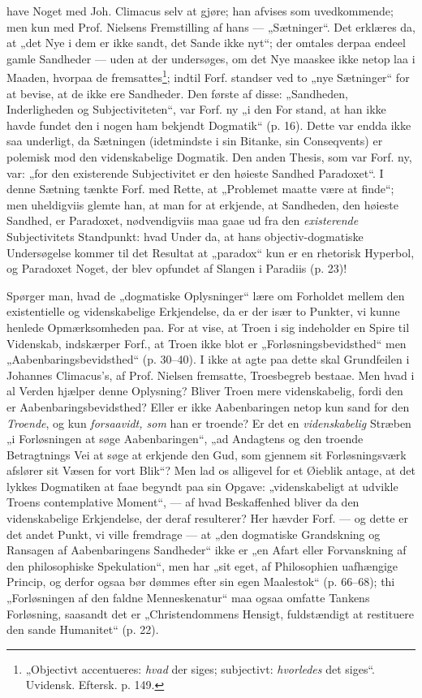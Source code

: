 \documentclass[12pt,a4paper]{book}
\newcommand{\opage}[1]{\marginnote{\footnotesize\textit{[#1]}}}
\begin{document}
have Noget med Joh. Climacus selv at gjøre; han afvises som
uvedkommende; men kun med Prof. Nielsens Fremstilling af
hans --- „Sætninger“. Det erklæres da, at „det Nye i dem
er ikke sandt, det Sande ikke nyt“; der omtales derpaa endeel
gamle Sandheder --- uden at der undersøges, om det Nye
maaskee ikke netop laa i Maaden, hvorpaa de fremsattes\footnote{„Objectivt accentueres: \emph{hvad} der siges; subjectivt: \emph{hvorledes} det
siges“. Uvidensk. Eftersk. p. 149.};
indtil Forf. standser ved to „nye Sætninger“ for at bevise,
at de ikke ere Sandheder. Den første af disse: „Sandheden,
Inderligheden og Subjectiviteten“, var Forf. ny „i den For%
\opage{33}\setcounter{footnote}{0}%
stand, at han ikke havde fundet den i nogen ham bekjendt
Dogmatik“ (p. 16). Dette var endda ikke saa underligt, da
Sætningen (idetmindste i sin Bitanke, sin Conseqvents) er
polemisk mod den videnskabelige Dogmatik. Den anden Thesis,
som var Forf. ny, var: „for den existerende Subjectivitet er
den høieste Sandhed Paradoxet“. I denne Sætning tænkte
Forf. med Rette, at „Problemet maatte være at finde“; men
uheldigviis glemte han, at man for at erkjende, at Sandheden,
den høieste Sandhed, er Paradoxet, nødvendigviis maa gaae
ud fra den \emph{existerende} Subjectivitets Standpunkt: hvad
Under da, at hans objectiv-dogmatiske Undersøgelse kommer til
det Resultat at „paradox“ kun er en rhetorisk Hyperbol, og
Paradoxet Noget, der blev opfundet af Slangen i Paradiis
(p. 23)!

Spørger man, hvad de „dogmatiske Oplysninger“ lære
om Forholdet mellem den existentielle og videnskabelige Erkjendelse,
da er der især to Punkter, vi kunne henlede Opmærksomheden
paa. For at vise, at Troen i sig indeholder
en Spire til Videnskab, indskærper Forf., at Troen ikke blot
er „Forløsningsbevidsthed“ men „Aabenbaringsbevidsthed“ (p.
30--40). I ikke at agte paa dette skal Grundfeilen i Johannes
Climacus's, af Prof. Nielsen fremsatte, Troesbegreb bestaae.
Men hvad i al Verden hjælper denne Oplysning? Bliver
Troen mere videnskabelig, fordi den er Aabenbaringsbevidsthed?
Eller er ikke Aabenbaringen netop kun sand for den \emph{Troende},
og kun \emph{forsaavidt, som} han er troende? Er det en \emph{videnskabelig}
Stræben „i Forløsningen at søge Aabenbaringen“,
„ad Andagtens og den troende Betragtnings Vei at søge at
erkjende den Gud, som gjennem sit Forløsningsværk afslører
sit Væsen for vort Blik“? Men lad os alligevel for et Øieblik
antage, at det lykkes Dogmatiken at faae begyndt paa sin
Opgave: „videnskabeligt at udvikle Troens contemplative Moment“,
--- af hvad Beskaffenhed bliver da den videnskabelige
Erkjendelse, der deraf resulterer? Her hævder Forf. --- og
\opage{34}\setcounter{footnote}{0}%
dette er det andet Punkt, vi ville fremdrage --- at „den dogmatiske
Grandskning og Ransagen af Aabenbaringens Sandheder“
ikke er „en Afart eller Forvanskning af den philosophiske
Spekulation“, men har „sit eget, af Philosophien uafhængige
Princip, og derfor ogsaa bør dømmes efter sin egen Maalestok“
(p. 66--68); thi „Forløsningen af den faldne Menneskenatur“
maa ogsaa omfatte Tankens Forløsning, saasandt det
er „Christendommens Hensigt, fuldstændigt at restituere den
sande Humanitet“ (p. 22).
\end{document}
